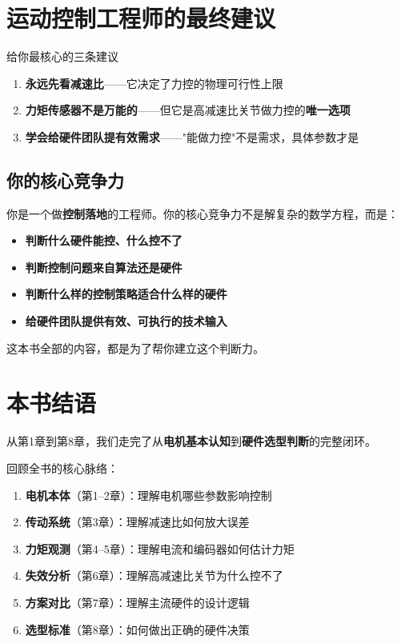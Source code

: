 \section{运动控制工程师的最终建议}

\begin{keyinsight}{给你最核心的三条建议}
\begin{enumerate}
  \item \textbf{永远先看减速比}——它决定了力控的物理可行性上限
  \item \textbf{力矩传感器不是万能的}——但它是高减速比关节做力控的\textbf{唯一选项}
  \item \textbf{学会给硬件团队提有效需求}——"能做力控"不是需求，具体参数才是
\end{enumerate}
\end{keyinsight}

\subsection{你的核心竞争力}

你是一个做\textbf{控制落地}的工程师。你的核心竞争力不是解复杂的数学方程，而是：
\begin{itemize}
  \item \textbf{判断什么硬件能控、什么控不了}
  \item \textbf{判断控制问题来自算法还是硬件}
  \item \textbf{判断什么样的控制策略适合什么样的硬件}
  \item \textbf{给硬件团队提供有效、可执行的技术输入}
\end{itemize}

这本书全部的内容，都是为了帮你建立这个判断力。

\section*{本书结语}

从第1章到第8章，我们走完了从\textbf{电机基本认知}到\textbf{硬件选型判断}的完整闭环。

回顾全书的核心脉络：

\begin{enumerate}
  \item \textbf{电机本体}（第1--2章）：理解电机哪些参数影响控制
  \item \textbf{传动系统}（第3章）：理解减速比如何放大误差
  \item \textbf{力矩观测}（第4--5章）：理解电流和编码器如何估计力矩
  \item \textbf{失效分析}（第6章）：理解高减速比关节为什么控不了
  \item \textbf{方案对比}（第7章）：理解主流硬件的设计逻辑
  \item \textbf{选型标准}（第8章）：如何做出正确的硬件决策
\end{enumerate}

